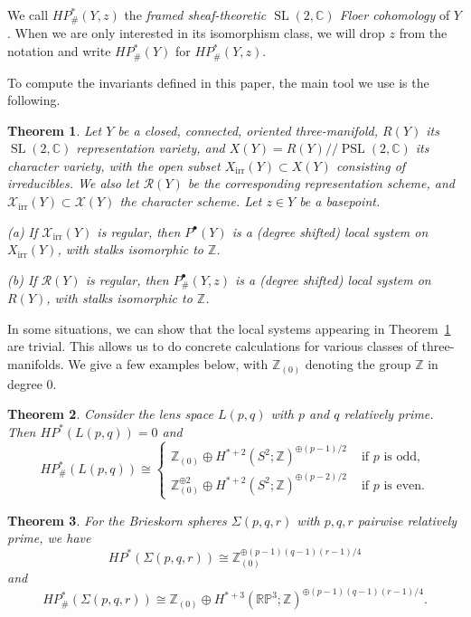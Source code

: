 \documentclass [11pt]{amsart}
\newtheorem {theorem}{Theorem}[section]
\theoremstyle{remark}
\def\zz {{\mathbb{Z}}}
\def\cc {{\mathbb{C}}}
\def\Z {\zz}
\def\sslash {/ \! /}
\def\rp {\mathbb{RP}}
\def\HP{\mathit{HP}}
\def\sl {{\operatorname{SL}(2, \cc)}}
\def\psl {{\operatorname{PSL}(2, \cc)}}
\def\Rep {R}
\def\Rs {\mathscr{R}}
\def\Char {X}
\def\Chars {\mathscr{X} \!}
\def\CharIrr {\Char_{\operatorname{irr}}}
\def\CharsIrr {\mathscr{X}_{\operatorname{irr}}}
\def\HPf{\HP_{\! \#}}
\begin{document}
We call  $\HPf^*(Y, z)$ the {\em framed sheaf-theoretic $\sl$ Floer cohomology} of $Y$. When we are only interested in its isomorphism class, we will drop $z$ from the notation and write $\HPf^*(Y)$ for $\HPf^*(Y, z)$.

To compute the invariants defined in this paper, the main tool we use is the following.

\begin{theorem}
\label{thm:main2}
Let $Y$ be a closed, connected, oriented three-manifold, $\Rep(Y)$ its $\sl$ representation variety, and $\Char(Y) = \Rep(Y)\sslash \psl$ its character variety, with the open subset $\CharIrr(Y) \subset \Char(Y)$ consisting of irreducibles. We also let $\Rs(Y)$ be the corresponding representation scheme, and $\CharsIrr(Y) \subset \Chars(Y)$ the character scheme. Let $z \in Y$ be a basepoint.

(a) If $\CharsIrr(Y)$ is regular, then $P^{\bullet}(Y)$ is a (degree shifted) local system on $\CharIrr(Y)$, with stalks isomorphic to $\Z$.

(b) If $\Rs(Y)$ is regular, then $P^{\bullet}_{\#}(Y, z)$ is a (degree shifted) local system on $\Rep(Y)$, with stalks isomorphic to $\Z$. 
\end{theorem}

In some situations, we can show that the local systems appearing in Theorem~\ref{thm:main2} are trivial. This allows us to do concrete calculations for various classes of three-manifolds. We give a few examples below, with $\Z_{(0)}$ denoting the group $\Z$ in degree $0$.

\begin{theorem}
\label{thm:lens}
Consider the lens space $L(p, q)$ with $p$ and $q$ relatively prime. Then $\HP^*(L(p,q)) =0$ and
$$ \HPf^*(L(p,q)) \cong
\begin{cases}
\Z_{(0)} \oplus H^{*+2}(S^2; \Z)^{\oplus (p-1)/2} & \text{ if $p$ is odd,}\\ 
 \Z_{(0)}^{\oplus 2} \oplus H^{*+2}(S^2; \Z)^{\oplus (p-2)/2} & \text{ if $p$ is even.}
 \end{cases}$$
\end{theorem}

\begin{theorem}
\label{thm:Brieskorn}
For the Brieskorn spheres $\Sigma(p,q,r)$ with $p,q,r$ pairwise relatively prime, we have
$$ \HP^*(\Sigma(p,q,r)) \cong \Z^{\oplus (p-1)(q-1)(r-1)/4}_{(0)}$$
and
$$ \HPf^*(\Sigma(p,q,r)) \cong \Z_{(0)} \oplus H^{*+3}(\rp^3; \Z)^{\oplus (p-1)(q-1)(r-1)/4}.$$
\end{theorem}
\end{document}
